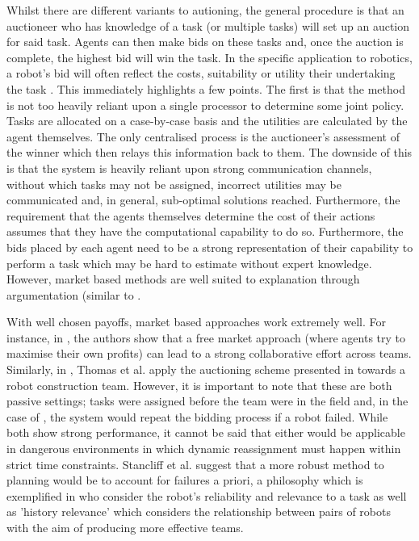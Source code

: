 \documentclass[preprint,11pt]{report}
\begin{document}
Whilst there are different variants to autioning, the general procedure is that an auctioneer who
has knowledge of a task (or multiple tasks) will set up an auction for said task. Agents can then
make bids on these tasks and, once the auction is complete, the highest bid will win the task. In
the specific application to robotics, a robot's bid will often reflect the costs, suitability or
utility their undertaking the task \cite{BernardineDias2006Market-basedAnalysis}. This immediately
highlights a few points. The first is that the method is not too heavily reliant upon a single
processor to determine some joint policy. Tasks are allocated on a case-by-case basis and the
utilities are calculated by the agent themselves. The only centralised process is the auctioneer's
assessment of the winner which then relays this information back to them. The downside of this is
that the system is heavily reliant upon strong communication channels, without which tasks may not
be assigned, incorrect utilities may be communicated and, in general, sub-optimal solutions reached.
Furthermore, the requirement that the agents themselves determine the cost of their actions assumes
that they have the computational capability to do so. Furthermore, the bids placed by each agent
need to be a strong representation of their capability to perform a task which may be hard to
estimate without expert knowledge. However, market based methods are well suited to explanation
through argumentation (similar to \cite{Jung2001DistributedArgumentation}. 

With well chosen payoffs, market based approaches work extremely well. For instance, in
\cite{Dias2000ASystem}, the authors show that a free market approach (where agents try to maximise
their own profits) can lead to a strong collaborative effort across teams. Similarly, in
\cite{Thomas2005Multi-robotScenarios}, Thomas et al. apply the auctioning scheme presented in
\cite{Gerkey2002Sold:Coordination} towards a robot construction team. However, it is important to
note that these are both passive settings; tasks were assigned before the team were in the field
and, in the case of \cite{Gerkey2002Sold:Coordination}, the system would repeat the bidding process
if a robot failed. While both show strong performance, it cannot be said that either would be
applicable in dangerous environments in which dynamic reassignment must happen within strict time
constraints. Stancliff et al. \cite{Stancliff2009PlanningAllocation} suggest that a more robust
method to planning would be to account for failures a priori, a philosophy which is exemplified in
\cite{Chen2010ACollaboration} who consider the robot's reliability and relevance to a task as well
as 'history relevance' which considers the relationship between pairs of robots with the aim of
producing more effective teams.
\end{document}

